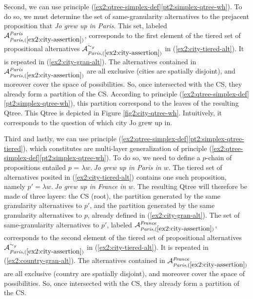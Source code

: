 Second, we can use principle (\ref{ex2:qtree-simplex-def}\ref{pt2:simplex-qtree-wh}). To do so, we must determine the set of same-granularity alternatives to the prejacent proposition that \textit{Jo grew up in Paris}. This set, labeled $\mathcal{A}_{\textit{Paris}, (\ref{ex2:city-assertion})}^{\textit{Paris}}$, corresponds to the first element of the tiered set of propositional alternatives $\mathcal{A}_{\textit{Paris}, (\ref{ex2:city-assertion})}^{\sim_g}$ in  (\ref{ex2:city-tiered-alt}). It is repeated in (\ref{ex2:city-gran-alt}). The alternatives contained in $\mathcal{A}_{\textit{Paris}, (\ref{ex2:city-assertion})}^{\textit{Paris}}$ are all exclusive (cities are spatially disjoint), and moreover cover the space of possibilities. So, once intersected with the CS, they already form a partition of the CS. According to principle (\ref{ex2:qtree-simplex-def}\ref{pt2:simplex-qtree-wh}), this partition correspond to the leaves of the resulting Qtree. This Qtree is depicted in Figure \ref{fig2:city-qtree-wh}. Intuitively, it corresponds to the question of which city Jo grew up in.


\begin{exe}
	\label{ex2:city-gran-alt}
\end{exe} 

Third and lastly, we can use principle (\ref{ex2:qtree-simplex-def}\ref{pt2:simplex-qtree-tiered}), which constitutes are multi-layer generalization of principle (\ref{ex2:qtree-simplex-def}\ref{pt2:simplex-qtree-wh}). To do so, we need to define a $p$-chain of propositions entailed $p$ = $\lambda w. \ $\textit{Jo grew up in Paris in $w$}. The tiered set of alternatives posited in (\ref{ex2:city-tiered-alt}) contains one such proposition, namely $p' = \lambda w. \ $\textit{Jo grew up in France in $w$}. The resulting Qtree will therefore be made of three layers: the CS (root), the partition generated by the same granularity alternatives to $p'$, and the partition generated by the same granularity alternatives to $p$, already defined in (\ref{ex2:city-gran-alt}). The set of same-granularity alternatives to $p'$, labeled $\mathcal{A}_{\textit{Paris}, (\ref{ex2:city-assertion})}^{\textit{France}}$, corresponds to the second element of the tiered set of propositional alternatives $\mathcal{A}_{\textit{Paris}, (\ref{ex2:city-assertion})}^{\sim_g}$ in  (\ref{ex2:city-tiered-alt}). It is repeated in (\ref{ex2:country-gran-alt}). The alternatives contained in $\mathcal{A}_{\textit{Paris}, (\ref{ex2:city-assertion})}^{\textit{France}}$ are all exclusive (country are spatially disjoint), and moreover cover the space of possibilities. So, once intersected with the CS, they already form a partition of the CS. 

